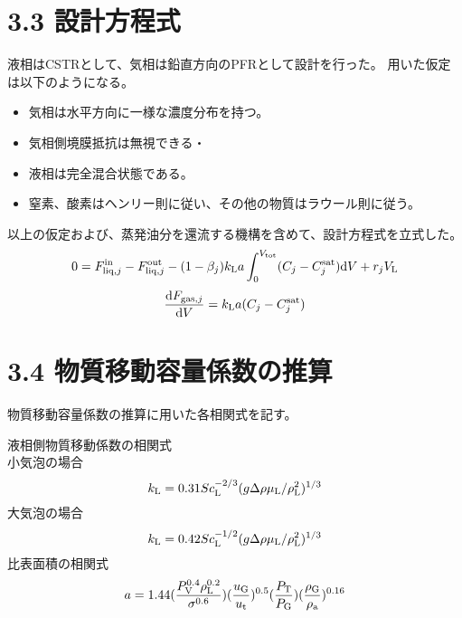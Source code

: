\documentclass[a4j]{jsarticle}
\begin{document}
\section*{3.3 設計方程式}
液相はCSTRとして、気相は鉛直方向のPFRとして設計を行った。
用いた仮定は以下のようになる。
\begin{itemize} 
    \item 気相は水平方向に一様な濃度分布を持つ。\\
    \item 気相側境膜抵抗は無視できる・\\
    \item 液相は完全混合状態である。\\
    \item 窒素、酸素はヘンリー則に従い、その他の物質はラウール則に従う。
\end{itemize}
以上の仮定および、蒸発油分を還流する機構を含めて、設計方程式を立式した。\\
\begin{equation}\nonumber
    0=F^{{\rm in}}_{{\rm liq},j}-F^{{\rm out}}_{{\rm liq},j} -(1-\beta_j) k_{{\rm L}}a
    \int^{V_{{\rm tot}}}_0(C_j - C^{{\rm sat}}_j){\rm d}V + r_j V_{{\rm L}}
\end{equation}
\begin{equation}\nonumber                                                
    \frac{{\rm d}F_{{\rm gas},j}}{{\rm d}V} = k_{{\rm L}}a(C_j - C^{{\rm sat}}_j)
\end{equation}

\section*{3.4 物質移動容量係数の推算}
物質移動容量係数の推算に用いた各相関式を記す。

液相側物質移動係数の相関式\\
小気泡の場合
\begin{equation}
    k_{{\rm L}} = 0.31Sc_{{\rm L}}^{-2/3}(g \Delta \rho \mu_{{\rm L}}/\rho_{{\rm L}}^2)^{1/3}
\end{equation}
大気泡の場合
\begin{equation}
    k_{{\rm L}} = 0.42Sc_{{\rm L}}^{-1/2}(g \Delta \rho \mu_{{\rm L}}/\rho_{{\rm L}}^2)^{1/3}
\end{equation}
比表面積の相関式
\begin{equation}
    a = 1.44(\frac{P_{{\rm V}}^{0.4} \rho_{{\rm L}}^{0.2} }{ \sigma^{0.6}})(\frac{u_{{\rm G}}}{u_{{\rm t}}})^{0.5}(\frac{P_{{\rm T}}}{P_{{\rm G}}})(\frac{\rho_{{\rm G}}}{\rho_{{\rm a}}})^{0.16}
\end{equation}
\end{document}
